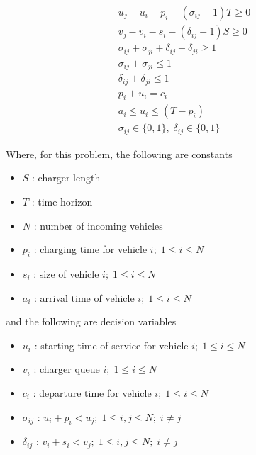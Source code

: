 \documentclass[letterpaper, 10pt, conference]{IEEEtran}
\begin{document}
\begin{subequations}
\label{eq:bapconstrs}
\begin{align}
    u_j - u_i - p_i - (\sigma_{ij} - 1)T \geq 0                     \label{subeq:baptime}         \\
    v_j - v_i - s_i - (\delta_{ij} - 1)S \geq 0                     \label{subeq:bapspace}        \\
    \sigma_{ij} + \sigma_{ji} + \delta_{ij} + \delta_{ji} \geq 1    \label{subeq:bapvalid_pos}    \\
    \sigma_{ij} + \sigma_{ji} \leq 1                                \label{subeq:bapsigma}        \\
    \delta_{ij} + \delta_{ji} \leq 1                                \label{subeq:bapdelta}        \\
    p_i + u_i = c_i                                                 \label{subeq:bapdetach}       \\
    a_i \leq u_i \leq (T - p_i)                                     \label{subeq:bapvalid_starts} \\
    \sigma_{ij} \in \{0,1\},\;\delta_{ij} \in \{0,1\}               \label{subeq:bapsdspace}
\end{align}
\end{subequations}

\noindent
Where, for this problem, the following are constants

\begin{itemize}
	\item \(S\)   : charger length
	\item \(T\)   : time horizon
	\item \(N\)   : number of incoming vehicles
	\item \(p_i\) : charging time for vehicle \(i;\; 1 \leq i \leq N\)
	\item \(s_i\) : size of vehicle \(i;\; 1 \leq i \leq N\)
	\item \(a_i\) : arrival time of vehicle \(i;\; 1 \leq i \leq N\)
\end{itemize}

\noindent
and the following are decision variables

\begin{itemize}
    \item \(u_i\)         : starting time of service for vehicle \(i;\; 1 \leq i \leq N\)
    \item \(v_i\)         : charger queue \(i;\; 1 \leq i \leq N\)
    \item \(c_i\)         : departure time for vehicle \(i;\; 1 \leq i \leq N\)
    \item \(\sigma_{ij}\) : \(u_i + p_i < u_j;\; 1 \leq i,j \leq N ;\; i \neq j \)
    \item \(\delta_{ij}\) : \(v_i + s_i < v_j;\; 1 \leq i,j \leq N ;\; i \neq j \)
\end{itemize}
\end{document}
